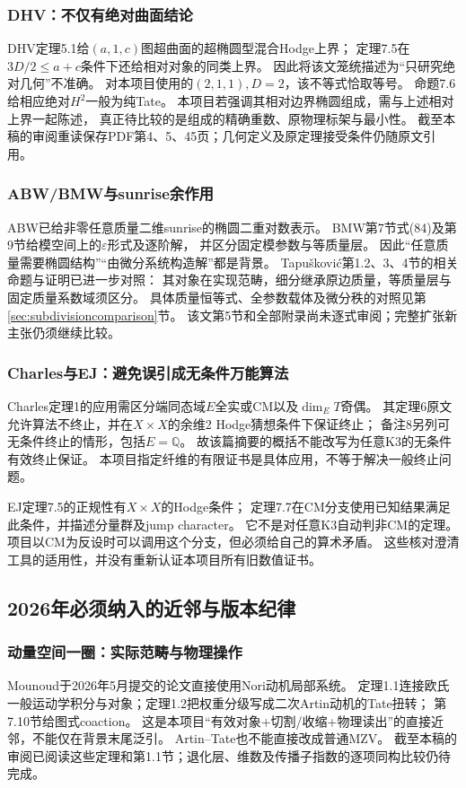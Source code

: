 \documentclass[11pt,a4paper]{ctexart}
\theoremstyle{cnplain}\newtheorem{theorem}{定理}[section]
\theoremstyle{definition}\newtheorem{definition}[theorem]{定义}
\theoremstyle{remark}\newtheorem{remark}[theorem]{注}
\newcommand{\Q}{\mathbb Q}\newcommand{\cC}{\mathcal C}
\begin{document}
\subsubsection{DHV：不仅有绝对曲面结论}
DHV定理5.1给$(a,1,c)$图超曲面的超椭圆型混合Hodge上界；
定理7.5在$3D/2\le a+c$条件下还给相对对象的同类上界。
因此将该文笼统描述为“只研究绝对几何”不准确。
对本项目使用的$(2,1,1),D=2$，该不等式恰取等号。
命题7.6给相应绝对$H^2$一般为纯Tate。
本项目若强调其相对边界椭圆组成，需与上述相对上界一起陈述，
真正待比较的是组成的精确重数、原物理标架与最小性。
截至本稿的审阅重读保存PDF第4、5、45页；几何定义及原定理接受条件仍随原文引用。

\subsubsection{ABW/BMW与sunrise余作用}
ABW\cite{LitABW}已给非零任意质量二维sunrise的椭圆二重对数表示。
BMW\cite{LitBMW}第7节式(84)及第9节给模空间上的$\varepsilon$形式及逐阶解，
并区分固定模参数与等质量层。
因此“任意质量需要椭圆结构”“由微分系统构造解”都是背景。
Tapušković\cite{LitTap}第1.2、3、4节的相关命题与证明已进一步对照：
其对象在实现范畴，细分继承原边质量，等质量层与固定质量系数域须区分。
具体质量恒等式、全参数载体及微分秩的对照见第\ref{sec:subdivisioncomparison}节。
该文第5节和全部附录尚未逐式审阅；完整扩张新主张仍须继续比较。

\subsubsection{Charles与EJ：避免误引成无条件万能算法}
Charles定理1的应用需区分端同态域$E$全实或CM以及$\dim_E T$奇偶。
其定理6原文允许算法不终止，并在$X\times X$的余维2 Hodge猜想条件下保证终止；
备注8另列可无条件终止的情形，包括$E=\Q$。
故该篇摘要的概括不能改写为任意K3的无条件有效终止保证。
本项目指定纤维的有限证书是具体应用，不等于解决一般终止问题。

EJ定理7.5的正规性有$X\times X$的Hodge条件；
定理7.7在CM分支使用已知结果满足此条件，并描述分量群及jump character。
它不是对任意K3自动判非CM的定理。
项目以CM为反设时可以调用这个分支，但必须给自己的算术矛盾。
这些核对澄清工具的适用性，并没有重新认证本项目所有旧数值证书。

\subsection{2026年必须纳入的近邻与版本纪律}
\subsubsection{动量空间一圈：实际范畴与物理操作}
Mounoud于2026年5月提交的论文\cite{LitMou}直接使用Nori动机局部系统。
定理1.1连接欧氏一般运动学积分与对象；定理1.2把权重分级写成二次Artin动机的Tate扭转；
第7.10节给图式coaction。
这是本项目“有效对象+切割/收缩+物理读出”的直接近邻，不能仅在背景末尾泛引。
Artin--Tate也不能直接改成普通MZV。
截至本稿的审阅已阅读这些定理和第1.1节；退化层、维数及传播子指数的逐项同构比较仍待完成。
\end{document}
